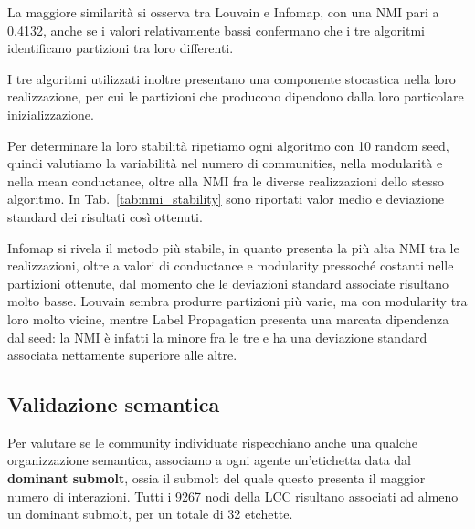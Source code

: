 \documentclass[twocolumn]{article}
\begin{document}
   La maggiore similarità si osserva tra Louvain e Infomap, con una NMI pari a 0.4132, anche se i valori relativamente bassi confermano che i tre algoritmi identificano partizioni tra loro differenti.

   I tre algoritmi utilizzati inoltre presentano una componente stocastica nella loro realizzazione, per cui le partizioni che producono dipendono dalla loro particolare inizializzazione. 

   Per determinare la loro stabilità ripetiamo ogni algoritmo con 10 random seed, quindi valutiamo la variabilità nel numero di communities, nella modularità e nella mean conductance, oltre alla NMI fra le diverse realizzazioni dello stesso algoritmo.
   In Tab.~\ref{tab:nmi_stability} sono riportati valor medio e deviazione standard dei risultati così ottenuti.  

   \begin{table}[htb]
      \centering
      \caption{Stabilità dei tre algoritmi attraverso dieci random seed.}
      \label{tab:nmi_stability}
   \end{table}

   Infomap si rivela il metodo più stabile, in quanto presenta la più alta NMI tra le realizzazioni, oltre a valori di conductance e modularity pressoché costanti nelle partizioni ottenute, dal momento che le deviazioni standard associate risultano molto basse. 
   Louvain sembra produrre partizioni più varie, ma con modularity tra loro molto vicine, mentre Label Propagation presenta una marcata dipendenza dal seed: la NMI è infatti la minore fra le tre e ha una deviazione standard associata nettamente superiore alle altre.

   \subsection{Validazione semantica}
   Per valutare se le community individuate rispecchiano anche una qualche organizzazione semantica, associamo a ogni agente un'etichetta data dal \textbf{dominant submolt}, ossia il submolt del quale questo presenta il maggior numero di interazioni. 
   Tutti i 9267 nodi della LCC risultano associati ad almeno un dominant submolt, per un totale di 32 etchette. 
\end{document}
